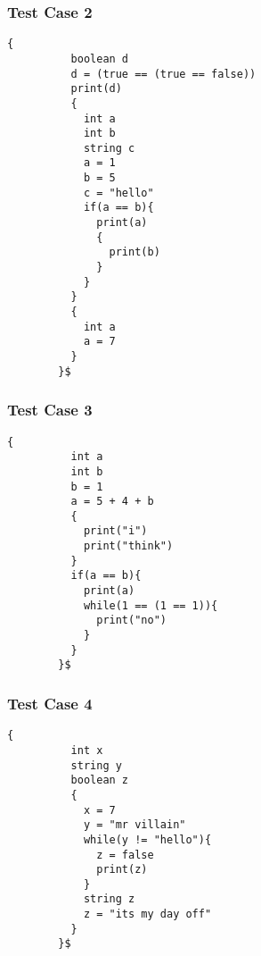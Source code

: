 \documentclass[letterpaper, 10pt,DIV=13]{scrartcl}
\numberwithin{equation}{section} %
\numberwithin{figure}{section} %
\numberwithin{table}{section} %
\begin{document}
\subsubsection*{Test Case 2}
    \lstset{numbers=left, numberstyle=\tiny, stepnumber=1, numbersep=5pt, basicstyle=\footnotesize\ttfamily}
    \begin{lstlisting}[frame=single, ]
        {
          boolean d
          d = (true == (true == false))
          print(d)
          {
            int a
            int b
            string c
            a = 1
            b = 5
            c = "hello"
            if(a == b){
              print(a)
              {
                print(b)
              }
            }
          }
          {
            int a
            a = 7
          }
        }$
    \end{lstlisting}

\subsubsection*{Test Case 3}
    \lstset{numbers=left, numberstyle=\tiny, stepnumber=1, numbersep=5pt, basicstyle=\footnotesize\ttfamily}
    \begin{lstlisting}[frame=single, ]
        {
          int a
          int b
          b = 1
          a = 5 + 4 + b
          {
            print("i")
            print("think")
          }
          if(a == b){
            print(a)
            while(1 == (1 == 1)){
              print("no")
            }
          }
        }$
    \end{lstlisting}

\subsubsection*{Test Case 4}
    \lstset{numbers=left, numberstyle=\tiny, stepnumber=1, numbersep=5pt, basicstyle=\footnotesize\ttfamily}
    \begin{lstlisting}[frame=single, ]
        {
          int x
          string y
          boolean z
          {
            x = 7
            y = "mr villain"
            while(y != "hello"){
              z = false
              print(z)
            }
            string z
            z = "its my day off"
          }
        }$
    \end{lstlisting}


\end{document}
